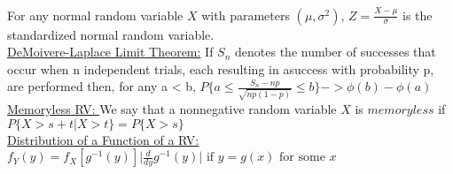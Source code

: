 \documentclass{article}
\begin{document}
	\\
	For any normal random variable $X$ with parameters $(\mu, \sigma^2)$, $Z = \frac{X - \mu}{\sigma}$ is the standardized normal random variable.
	\\
	\underline{DeMoivere-Laplace Limit Theorem:} If $S_n$ denotes the number of successes that occur when n independent trials, each resulting in asuccess with probability p, are performed then, for any a < b, $P\{a \leq \frac{S_n -np}{\sqrt{np(1 -p)}} \leq b\} -> \phi(b) - \phi(a)$
	\\
	\underline{Memoryless RV: } We say that a nonnegative random variable $X$ is $memoryless$ if $P\{X >s + t \vert X > t\} = P\{X > s\}$
	\\
	\underline{Distribution of a Function of a RV: } $f_Y(y) = f_X[g^{-1}(y)] \vert{\frac{d}{dy}g^{-1}(y)}\vert \text{  if } y = g(x) \text{ for some } x$
\end{document}
